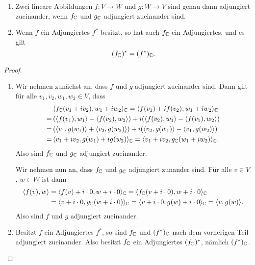 \documentclass[a4paper,10pt,numbers=noenddot]{scrartcl}
\begin{document}
\begin{proposition}\label{prop: complexification has adjoints}
  \begin{enumerate}[leftmargin=*]
    \item
      Zwei lineare Abbildungen $f \colon V \to W$ und $g \colon W \to V$ sind genau dann adjungiert zueinander, wenn $f_{\mathbb{C}}$ und $g_{\mathbb{C}}$ adjungiert zueinander sind.
    \item
      Wenn $f$ ein Adjungiertes $f^*$ besitzt, so hat auch $f_{\mathbb{C}}$ ein Adjungiertes, und es gilt
      \[
        (f_{\mathbb{C}})^* = (f^*)_{\mathbb{C}}.
      \]
  \end{enumerate}
\end{proposition}


\begin{proof}
  \begin{enumerate}[leftmargin=*]
    \item
      Wir nehmen zunächst an, dass $f$ und $g$ adjungiert zueinander sind.
      Dann gilt für alle $v_1, v_2, w_1, w_2 \in V$, dass
      \begin{align*}
        &\,  \langle  f_{\mathbb{C}}( v_1 + i v_2 ), w_1 + i w_2  \rangle_{\mathbb{C}}
        =     \langle  f(v_1) + i f(v_2), w_1 + i w_2 \rangle_{\mathbb{C}} \\
        =&\,  (\langle f(v_1), w_1 \rangle + \langle f(v_2), w_2 \rangle) + i(\langle f(v_2), w_1 \rangle - \langle f(v_1), w_2 \rangle) \\
        =&\,  (\langle v_1, g(w_1) \rangle + \langle v_2, g(w_2) \rangle) + i(\langle v_2, g(w_1) \rangle - \langle v_1, g(w_2) \rangle) \\
        =&\,  \langle  v_1 + i v_2, g(w_1) + i g(w_2)  \rangle_{\mathbb{C}}
        =     \langle  v_1 + i v_2, g_{\mathbb{C}}( w_1 + i w_2 )  \rangle_{\mathbb{C}}.
      \end{align*}
      Also sind $f_{\mathbb{C}}$ und $g_{\mathbb{C}}$ adjungiert zueinander.
      
      Wir nehmen nun an, dass $f_{\mathbb{C}}$ und $g_{\mathbb{C}}$ adjungiert zunander sind.
      Für alle $v \in V$, $w \in W$ ist dann
      \begin{align*}
            \langle f(v), w \rangle
        &=  \langle f(v) + i \cdot 0, w + i \cdot 0 \rangle_{\mathbb{C}}
         =  \langle f_{\mathbb{C}}(v + i \cdot 0), w + i \cdot 0 \rangle_{\mathbb{C}} \\
        &=  \langle v + i \cdot 0, g_{\mathbb{C}}(w + i \cdot 0) \rangle_{\mathbb{C}}
         =  \langle v + i \cdot 0, g(w) + i \cdot 0 \rangle_{\mathbb{C}}
         =  \langle v, g(w) \rangle.
      \end{align*}
      Also sind $f$ und $g$ adjungiert zueinander.
      
    \item
      Besitzt $f$ ein Adjungiertes $f^*$, so sind $f_{\mathbb{C}}$ und $(f^*)_{\mathbb{C}}$ nach dem vorherigen Teil adjungiert zueinander.
      Also besitzt $f_{\mathbb{C}}$ ein Adjungiertes $(f_{\mathbb{C}})^*$, nämlich $(f^*)_{\mathbb{C}}$.
  \end{enumerate}
\end{proof}
\end{document}
